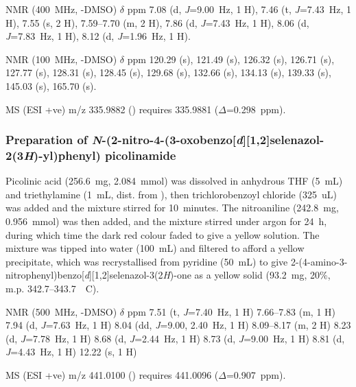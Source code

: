 \begin{refsection}
 NMR (400~MHz, -DMSO) $\delta$ ppm
7.08 (d, \emph{J}=9.00~Hz, 1 H),
7.46 (t, \emph{J}=7.43~Hz, 1 H),
7.55 (s, 2 H),
7.59--7.70 (m, 2 H),
7.86 (d, \emph{J}=7.43~Hz, 1 H),
8.06 (d, \emph{J}=7.83~Hz, 1 H),
8.12 (d, \emph{J}=1.96~Hz, 1 H).

 NMR (100~MHz, -DMSO) $\delta$ ppm
120.29 (s),
121.49 (s),
126.32 (s),
126.71 (s),
127.77 (s),
128.31 (s),
128.45 (s),
129.68 (s),
132.66 (s),
134.13 (s),
139.33 (s),
145.03 (s),
165.70 (s).

MS (ESI +ve) m/z 335.9882 ()  requires 335.9881 ($\Delta$=0.298~ppm).

\subsubsection[Preparation of \refcmpd{ebs-3no2-4nh-2py}]{Preparation of \emph{N}-(2-nitro-4-(3-oxobenzo[\emph{d}][1,2]selenazol-2(3\emph{H})-yl)phenyl) picolinamide }
Picolinic acid (256.6~mg, 2.084~mmol) was dissolved in anhydrous THF (5~mL) and triethylamine (1~mL, dist. from ), then trichlorobenzoyl chloride (325~uL) was added and the mixture stirred for 10~minutes.
The nitroaniline  (242.8~mg, 0.956~mmol) was then added, and the mixture stirred under argon for 24~h, during which time the dark red colour faded to give a yellow solution.
The mixture was tipped into water (100~mL) and filtered to afford a yellow precipitate, which was recrystallised from pyridine (50~mL) to give 2-(4-amino-3-nitrophenyl)benzo[\emph{d}][1,2]selenazol-3(2\emph{H})-one  as a yellow solid (93.2~mg, 20\%, m.p. 342.7--343.7~\degree~C).

 NMR (500~MHz, -DMSO) $\delta$ ppm
7.51 (t, \emph{J}=7.40~Hz, 1 H)
7.66--7.83 (m, 1 H)
7.94 (d, \emph{J}=7.63~Hz, 1 H)
8.04 (dd, \emph{J}=9.00, 2.40~Hz, 1 H)
8.09--8.17 (m, 2 H)
8.23 (d, \emph{J}=7.78~Hz, 1 H)
8.68 (d, \emph{J}=2.44~Hz, 1 H)
8.73 (d, \emph{J}=9.00~Hz, 1 H)
8.81 (d, \emph{J}=4.43~Hz, 1 H)
12.22 (s, 1 H)

MS (ESI +ve) m/z 441.0100 ()  requires 441.0096 ($\Delta$=0.907~ppm).

\end{refsection}
